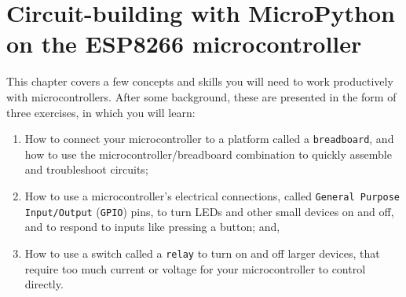 \setchapterpreamble[u]{\margintoc}
\chapter{Circuit-building with MicroPython on the ESP8266 microcontroller}
This chapter covers a few concepts and skills you will need to work productively with microcontrollers. After some background, these are presented in the form of three exercises, in which you will learn:
\begin{enumerate}
	\item How to connect your microcontroller to a platform called a \texttt{breadboard}, and how to use the microcontroller/breadboard combination to quickly assemble and troubleshoot circuits;
	\item How to use a microcontroller's electrical connections, called \texttt{General Purpose Input/Output} (\texttt{GPIO}) pins, to turn LEDs and other small devices on and off, and to respond to inputs like pressing a button; and,
	\item How to use a switch called a \texttt{relay} to turn on and off larger devices, that require too much current or voltage for your microcontroller to control directly.
\end{enumerate}

